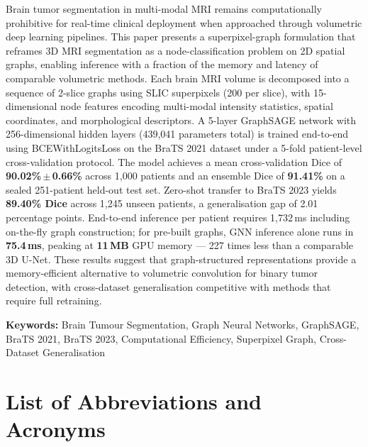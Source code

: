 \documentclass{article}
\begin{document}
Brain tumor segmentation in multi-modal MRI remains computationally prohibitive for
real-time clinical deployment when approached through volumetric deep learning
pipelines. This paper presents a superpixel-graph formulation that reframes 3D MRI
segmentation as a node-classification problem on 2D spatial graphs, enabling
inference with a fraction of the memory and latency of comparable volumetric methods.
Each brain MRI volume is decomposed into a sequence of 2-slice graphs using SLIC
superpixels (200 per slice), with 15-dimensional node features encoding multi-modal
intensity statistics, spatial coordinates, and morphological descriptors. A 5-layer
GraphSAGE network with 256-dimensional hidden layers (439,041 parameters total) is
trained end-to-end using BCEWithLogitsLoss on the BraTS 2021 dataset under a
5-fold patient-level cross-validation protocol. The model achieves a mean
cross-validation Dice of \textbf{90.02\%\,$\pm$\,0.66\%} across 1,000 patients and
an ensemble Dice of \textbf{91.41\%} on a sealed 251-patient held-out test set.
Zero-shot transfer to BraTS 2023 yields \textbf{89.40\% Dice} across 1,245 unseen
patients, a generalisation gap of 2.01 percentage points. End-to-end inference per
patient requires 1,732\,ms including on-the-fly graph construction; for pre-built
graphs, GNN inference alone runs in \textbf{75.4\,ms}, peaking at \textbf{11\,MB}
GPU memory --- 227 times less than a comparable 3D U-Net. These results suggest that
graph-structured representations provide a memory-efficient alternative to volumetric
convolution for binary tumor detection, with cross-dataset generalisation competitive
with methods that require full retraining.

\vspace{4mm}
\noindent\textbf{Keywords:} Brain Tumour Segmentation, Graph Neural Networks,
GraphSAGE, BraTS 2021, BraTS 2023, Computational Efficiency, Superpixel Graph,
Cross-Dataset Generalisation

\cleardoublepage

\section*{List of Abbreviations and Acronyms}
\end{document}
